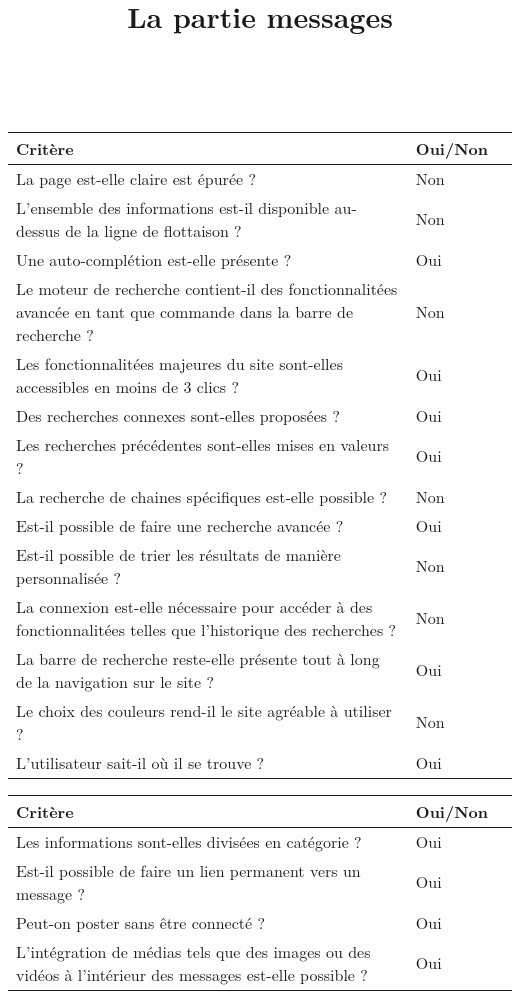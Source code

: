 \documentclass [a4 paper,11pt]{report}
\begin{document}
{\renewcommand{\arraystretch}{1.5}%
\begin{tabularx}{\textwidth}{|X|l|c|}
  \hline
  \textbf{Critère} & \textbf{Oui/Non} \\
\hline
La page est-elle claire est épurée ? & Non\\
\hline
L'ensemble des informations est-il disponible au-dessus de la ligne de flottaison ? & Non\\
\hline
Une auto-complétion est-elle présente ? & Oui\\
\hline
Le moteur de recherche contient-il des fonctionnalitées avancée en tant que commande dans la barre de recherche ? & Non\\
\hline
Les fonctionnalitées majeures du site sont-elles accessibles en moins de 3 clics ? & Oui\\
\hline
Des recherches connexes sont-elles proposées ? & Oui\\
\hline
Les recherches précédentes sont-elles mises en valeurs ? & Oui \\
\hline
La recherche de chaines spécifiques est-elle possible ? & Non\\
\hline
Est-il possible de faire une recherche avancée ? & Oui\\
\hline
Est-il possible de trier les résultats de manière personnalisée ? & Non\\
\hline
La connexion est-elle nécessaire pour accéder à des fonctionnalitées telles que l'historique des recherches ? & Non\\
\hline
La barre de recherche reste-elle présente tout à long de la navigation sur le site ? & Oui \\
\hline
Le choix des couleurs rend-il le site agréable à utiliser ? & Non\\
\hline
L'utilisateur sait-il où il se trouve ? & Oui\\
\hline
\end{tabularx}
\newpage
\title{\textbf{La partie messages \\\\}}
\begin{tabularx}{\textwidth}{|X|l|c|}
  \hline
  \textbf{Critère} & \textbf{Oui/Non} \\
  \hline
  Les informations sont-elles divisées en catégorie ?& Oui\\
  \hline
  Est-il possible de faire un lien permanent vers un message ?& Oui\\
  \hline
  Peut-on poster sans être connecté ? & Oui\\
  \hline
  L'intégration de médias tels que des images ou des vidéos à l'intérieur des messages est-elle possible ? & Oui\\

\end{tabularx}}
\end{document}
